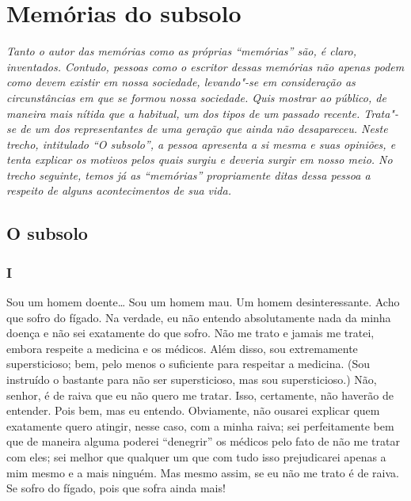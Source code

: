 \part{Memórias do subsolo}

{
	
\mbox{}
\vfill
\thispagestyle{empty}

\textit{Tanto o autor das memórias como as próprias ``memórias'' são, é claro,
inventados. Contudo, pessoas como o escritor dessas memórias não apenas podem
como devem existir em nossa sociedade, levando"-se em consideração as
circunstâncias em que se formou nossa sociedade. Quis mostrar ao público, de
maneira mais nítida que a habitual, um dos tipos de um passado recente.
Trata"-se de um dos representantes de uma geração que ainda não desapareceu.
Neste trecho, intitulado “O subsolo”, a pessoa apresenta a si mesma e suas
opiniões, e tenta explicar os motivos pelos quais surgiu e deveria surgir em
nosso meio. No trecho seguinte, temos já as “memórias” propriamente ditas dessa
pessoa a respeito de alguns acontecimentos de sua vida.}

}

\chapter{O subsolo}

\section{I}

Sou um homem doente\ldots{} Sou um homem mau. Um homem desinteressante. Acho
que sofro do fígado. Na verdade, eu não entendo absolutamente nada da
minha doença e não sei exatamente do que sofro. Não me trato e jamais
me tratei, embora respeite a medicina e os médicos. Além disso, sou
extremamente supersticioso; bem, pelo menos o suficiente para respeitar
a medicina. (Sou instruído o bastante para não ser supersticioso, mas
sou supersticioso.) Não, senhor, é de raiva que eu não quero me tratar.
Isso, certamente, não haverão de entender. Pois bem, mas eu entendo.
Obviamente, não ousarei explicar quem exatamente quero atingir, nesse
caso, com a minha raiva; sei perfeitamente bem que de maneira alguma
poderei “denegrir” os médicos pelo fato de não me tratar com eles; sei
melhor que qualquer um que com tudo isso prejudicarei apenas a mim
mesmo e a mais ninguém. Mas mesmo assim, se eu não me trato é de raiva.
Se sofro do fígado, pois que sofra ainda mais!

